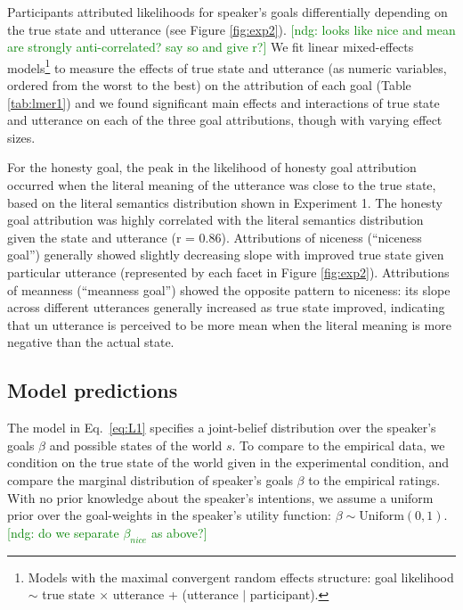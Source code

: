 \documentclass[10pt,letterpaper]{article}
\newcommand{\ndg}[1]{\textcolor{Green}{[ndg: #1]}}
\begin{document}

Participants attributed likelihoods for speaker's goals differentially depending on the true state and utterance (see Figure \ref{fig:exp2}).
\ndg{looks like nice and mean are strongly anti-correlated? say so and give r?}
 We fit linear mixed-effects models\footnote{Models with the maximal convergent random effects structure: goal likelihood $\sim$ true state $\times$ utterance + (utterance $|$ participant).} to measure the effects of true state and utterance (as numeric variables, ordered from the worst to the best) on the attribution of each goal (Table \ref{tab:lmer1}) and we found significant main effects and interactions of true state and utterance on each of the three goal attributions, though with varying effect sizes. 

For the honesty goal, the peak in the likelihood of honesty goal attribution occurred when the literal meaning of the utterance was close to the true state, based on the literal semantics distribution shown in Experiment 1. The honesty goal attribution was highly correlated with the literal semantics distribution given the state and utterance (r = 0.86). 
Attributions of niceness (``niceness goal'') generally showed slightly decreasing slope with improved true state given particular utterance (represented by each facet in Figure \ref{fig:exp2}). 
Attributions of meanness (``meanness goal'') showed the opposite pattern to niceness: its slope across different utterances generally increased as true state improved, indicating that un utterance is perceived to be more mean when the literal meaning is more negative than the actual state.

\subsection{Model predictions}

The model in Eq.~\ref{eq:L1} specifies a joint-belief distribution over the speaker's goals $\beta$ and possible states of the world $s$.
To compare to the empirical data, we condition on the true state of the world given in the experimental condition, and compare the marginal distribution of speaker's goals $\beta$ to the empirical ratings.
With no prior knowledge about the speaker's intentions, we assume a uniform prior over the goal-weights in the speaker's utility function: $\beta \sim \text{Uniform}(0,1)$. \ndg{do we separate $\beta_{nice}$ as above?}
\end{document}
